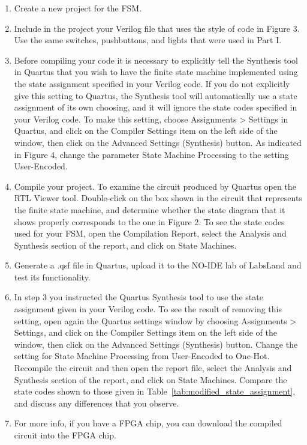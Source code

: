 \documentclass[epsfig,10pt,fullpage]{article}
\begin{document}
\begin{enumerate}
\item Create a new project for the FSM.

\item Include in the project your Verilog file that uses the style of code in Figure 3.
Use the same switches, pushbuttons, and lights that were used in Part I.

\item Before compiling your code it is necessary to explicitly tell the Synthesis tool in
Quartus that you wish to have the finite state machine implemented using the state
assignment specified in your Verilog code. If you do not explicitly give this
setting to Quartus, the Synthesis tool will automatically use a state assignment of
its own choosing, and it will ignore the state codes specified in your Verilog code. To
make this setting, choose {\sf Assignments > Settings} in Quartus, and click on the
{\sf Compiler Settings} item on the left side of the window, then click on 
the {\sf Advanced Settings (Synthesis)} button.  As indicated in Figure 4, change the 
parameter {\sf State Machine Processing} to the setting {\sf User-Encoded}.

\item Compile your project. To examine the circuit produced by Quartus open 
the RTL Viewer tool. Double-click
on the box shown in the circuit that represents the finite state machine, and determine
whether the state diagram that it shows properly corresponds to the one in Figure 2.
To see the state codes used for your FSM, open the Compilation Report, select the {\sf Analysis
and Synthesis} section of the report, and click on {\sf State Machines}.

\item Generate a .qsf file in Quartus, upload it to the NO-IDE lab of LabsLand and test its functionality.

\item In step 3 you instructed the Quartus Synthesis tool to use the state
assignment given in your Verilog code. To see the result of removing this setting, open
again the Quartus settings window by choosing {\sf Assignments > Settings}, and 
click on the {\sf Compiler Settings} item on the left side of the window, then click on 
the {\sf Advanced Settings (Synthesis)} button. Change the setting for  
{\sf State Machine Processing} from {\sf User-Encoded} to {\sf One-Hot}. Recompile the
circuit and then open the report file, select the {\sf Analysis
and Synthesis} section of the report, and click on {\sf State Machines}.
Compare the state codes shown to those given in Table~\ref{tab:modified_state_assignment}, and
discuss any differences that you observe.

\item For more info, if you have a FPGA chip, you can download the compiled circuit into the FPGA chip.
\end{enumerate}
\end{document}
